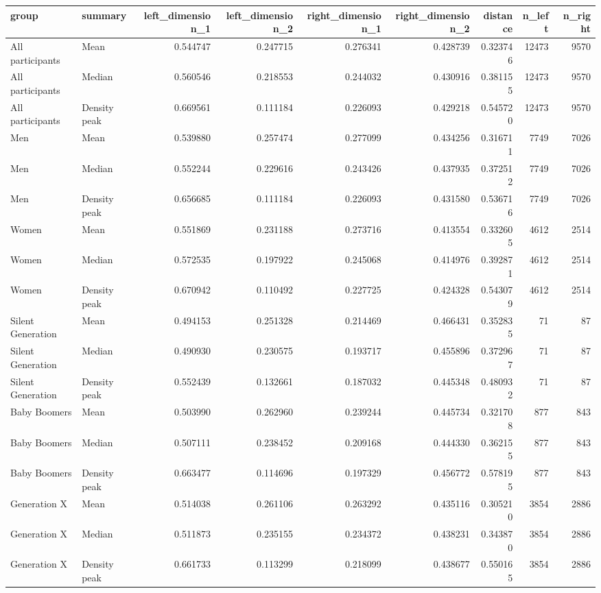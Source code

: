 \begin{tabular}{llrrrrrrr}
\toprule
group & summary & left\_dimension\_1 & left\_dimension\_2 & right\_dimension\_1 & right\_dimension\_2 & distance & n\_left & n\_right \\
\midrule
All participants & Mean & 0.544747 & 0.247715 & 0.276341 & 0.428739 & 0.323746 & 12473 & 9570 \\
All participants & Median & 0.560546 & 0.218553 & 0.244032 & 0.430916 & 0.381155 & 12473 & 9570 \\
All participants & Density peak & 0.669561 & 0.111184 & 0.226093 & 0.429218 & 0.545720 & 12473 & 9570 \\
Men & Mean & 0.539880 & 0.257474 & 0.277099 & 0.434256 & 0.316711 & 7749 & 7026 \\
Men & Median & 0.552244 & 0.229616 & 0.243426 & 0.437935 & 0.372512 & 7749 & 7026 \\
Men & Density peak & 0.656685 & 0.111184 & 0.226093 & 0.431580 & 0.536716 & 7749 & 7026 \\
Women & Mean & 0.551869 & 0.231188 & 0.273716 & 0.413554 & 0.332605 & 4612 & 2514 \\
Women & Median & 0.572535 & 0.197922 & 0.245068 & 0.414976 & 0.392871 & 4612 & 2514 \\
Women & Density peak & 0.670942 & 0.110492 & 0.227725 & 0.424328 & 0.543079 & 4612 & 2514 \\
Silent Generation & Mean & 0.494153 & 0.251328 & 0.214469 & 0.466431 & 0.352835 & 71 & 87 \\
Silent Generation & Median & 0.490930 & 0.230575 & 0.193717 & 0.455896 & 0.372967 & 71 & 87 \\
Silent Generation & Density peak & 0.552439 & 0.132661 & 0.187032 & 0.445348 & 0.480932 & 71 & 87 \\
Baby Boomers & Mean & 0.503990 & 0.262960 & 0.239244 & 0.445734 & 0.321708 & 877 & 843 \\
Baby Boomers & Median & 0.507111 & 0.238452 & 0.209168 & 0.444330 & 0.362155 & 877 & 843 \\
Baby Boomers & Density peak & 0.663477 & 0.114696 & 0.197329 & 0.456772 & 0.578195 & 877 & 843 \\
Generation X & Mean & 0.514038 & 0.261106 & 0.263292 & 0.435116 & 0.305210 & 3854 & 2886 \\
Generation X & Median & 0.511873 & 0.235155 & 0.234372 & 0.438231 & 0.343870 & 3854 & 2886 \\
Generation X & Density peak & 0.661733 & 0.113299 & 0.218099 & 0.438677 & 0.550165 & 3854 & 2886 \\

\end{tabular}
